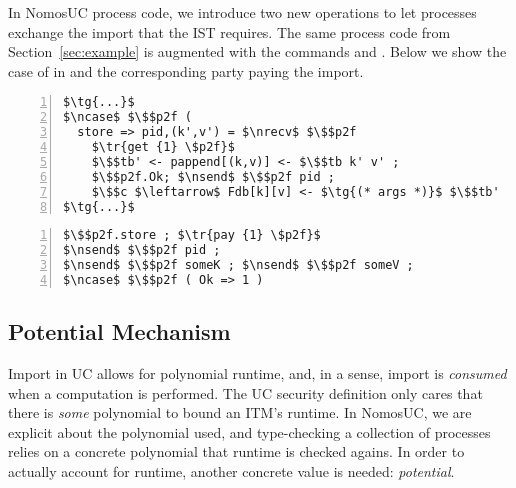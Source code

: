 In NomosUC process code, we introduce two new operations to let processes exchange the import that the IST requires.
The same \Fdb process code from Section~\ref{sec:example} is augmented with the commands \inline{$\nget$} and \inline{$\npay$}. Below we show the case of  in \Fdb and the corresponding party paying the import.
\begin{lstlisting}[basicstyle=\scriptsize\BeraMonottFamily, frame=single, mathescape, numbers=left, xleftmargin=2em, xrightmargin=2em]
$\tg{...}$
$\ncase$ $\$$p2f (
  store => pid,(k',v') = $\nrecv$ $\$$p2f
    $\tr{get {1} \$p2f}$
    $\$$tb' <- pappend[(k,v)] <- $\$$tb k' v' ;
    $\$$p2f.Ok; $\nsend$ $\$$p2f pid ;
    $\$$c $\leftarrow$ Fdb[k][v] <- $\tg{(* args *)}$ $\$$tb'
$\tg{...}$
\end{lstlisting}

\begin{lstlisting}[basicstyle=\scriptsize\BeraMonottFamily, frame=single, mathescape, numbers=left, xleftmargin=2em, xrightmargin=2em]
$\$$p2f.store ; $\tr{pay {1} \$p2f}$
$\nsend$ $\$$p2f pid ; 
$\nsend$ $\$$p2f someK ; $\nsend$ $\$$p2f someV ;
$\ncase$ $\$$p2f ( Ok => 1 )
\end{lstlisting}

\subsection{Potential Mechanism}
Import in UC allows for polynomial runtime, and, in a sense, import is \emph{consumed} when a computation is performed. 
The UC security definition only cares that there is \emph{some} polynomial to bound an ITM's runtime.
In NomosUC, we are explicit about the polynomial used, and type-checking a collection of processes relies on a concrete polynomial that runtime is checked agains.
In order to actually account for runtime, another concrete value is needed: \emph{potential}.

